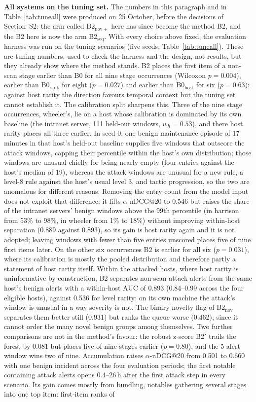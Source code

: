 \documentclass[conference]{IEEEtran}
\begin{document}
\textbf{All systems on the tuning set.} The numbers in this paragraph and in Table~\ref{tab:tuneall} were produced on 25 October, before the decisions of Section~S2: the arm called B2$_\mathrm{nov+}$ here has since become the method B2, and the B2 here is now the arm B2$_\mathrm{seq}$. With every choice above fixed, the evaluation harness was run on the tuning scenarios (five seeds; Table~\ref{tab:tuneall}). These are tuning numbers, used to check the harness and the design, not results, but they already show where the method stands. B2 places the first item of a non-scan stage earlier than B0 for all nine stage occurrences (Wilcoxon $p = 0.004$), earlier than B0$_\mathrm{rank}$ for eight ($p = 0.027$) and earlier than B0$_\mathrm{host}$ for six ($p = 0.63$): against host rarity the direction favours temporal context but the tuning set cannot establish it. The calibration split sharpens this. Three of the nine stage occurrences, wheeler's, lie on a host whose calibration is dominated by its own baseline (the intranet server, 111 held-out windows, $w_h = 0.53$), and there host rarity places all three earlier. In seed 0, one benign maintenance episode of 17 minutes in that host's held-out baseline supplies five windows that outscore the attack windows, capping their percentile within the host's own distribution; those windows are unusual chiefly for being nearly empty (four entries against the host's median of 19), whereas the attack windows are unusual for a new rule, a level-8 rule against the host's usual level 3, and tactic progression, so the two are anomalous for different reasons. Removing the entry count from the model input does not exploit that difference: it lifts $\alpha$-nDCG@20 to 0.546 but raises the share of the intranet servers' benign windows above the 99th percentile (in harrison from 53\% to 98\%, in wheeler from 1\% to 18\%) without improving within-host separation (0.889 against 0.893), so its gain is host rarity again and it is not adopted; leaving windows with fewer than five entries unscored places five of nine first items later. On the other six occurrences B2 is earlier for all six ($p = 0.031$), where its calibration is mostly the pooled distribution and therefore partly a statement of host rarity itself. Within the attacked hosts, where host rarity is uninformative by construction, B2 separates non-scan attack alerts from the same host's benign alerts with a within-host AUC of 0.893 (0.84--0.99 across the four eligible hosts), against 0.536 for level rarity: on its own machine the attack's window is unusual in a way severity is not. The binary novelty flag of B2$_\mathrm{nov}$ separates them better still (0.931) but ranks the queue worse (0.462), since it cannot order the many novel benign groups among themselves. Two further comparisons are not in the method's favour: the robust z-score B2$'$ trails the forest by 0.081 but places five of nine stages earlier ($p = 0.80$), and the 5-alert window wins two of nine. Accumulation raises $\alpha$-nDCG@20 from 0.501 to 0.660 with one benign incident across the four evaluation periods; the first notable containing attack alerts opens 0.4--26\,h after the first attack step in every scenario. Its gain comes mostly from bundling, notables gathering several stages into one top item: first-item ranks of 
\end{document}
